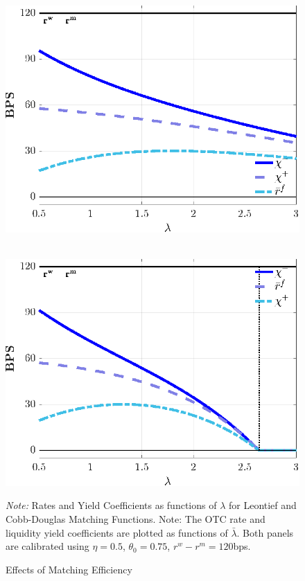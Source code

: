\documentclass[12pt,american,english,notitlepage]{article}
\begin{document}
\begin{figure}[tbh!]
   \begin{minipage}[b]{.45\linewidth} 
    \\[4pt] \includegraphics[width=1\linewidth]{NewCode/Figures/F_l_prices_lambda.eps}\end{minipage}\hfill{}  
   \begin{minipage}[b]{.45\linewidth}
     \\[4pt]
\includegraphics[width=1\linewidth]{NewCode/Figures/F_cd_prices_lambda.eps}
\end{minipage}
\caption{\label{fig:efficiency.compstat} Effects of Matching Efficiency}
\parbox[b]{0.99 \textwidth} {\footnotesize{\emph{Note:}} Rates and Yield Coefficients as functions of $\lambda$ for Leontief
and Cobb-Douglas Matching Functions. Note: The OTC rate and liquidity
yield coefficients are plotted as functions of $\bar{\lambda}$. Both
panels are calibrated using $\eta=0.5$, $\theta_{0}=0.75$, $r^{w}-r^{m}=120$bps.  }
\end{figure}
\end{document}
